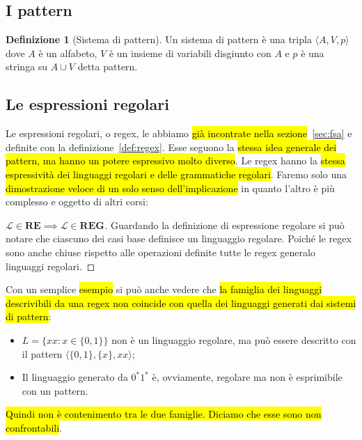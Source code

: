 \documentclass[a4paper,11pt,oneside]{article}
\theoremstyle{plain}
\theoremstyle{definition}
\newtheorem{defn}{Definizione}[section]
\theoremstyle{remark}
\begin{document}
\subsection{I pattern}\label{sec:pattern}

\begin{defn}[Sistema di pattern]
  Un sistema di pattern è una tripla $\langle A, V, p \rangle$ dove $A$ è un
  alfabeto, $V$ è un insieme di variabili disgiunto con $A$ e $p$ è una stringa
  su $A \cup V$ detta pattern.
\end{defn}

\subsection{Le espressioni regolari}\label{sec:regex}

Le espressioni regolari, o regex, le abbiamo \hl{già incontrate nella
sezione}~\ref{sec:fsa} e definite con la definizione~\ref{def:regex}. Esse
seguono la \hl{stessa idea generale dei pattern, ma hanno un potere espressivo
molto diverso}. Le regex hanno la\hl{ stessa espressività dei linguaggi regolari
e delle grammatiche regolari}. Faremo solo una \hl{dimostrazione veloce di un
solo senso dell'implicazione} in quanto l'altro è più complesso e oggetto di
altri corsi:

\begin{proof}[$\mathcal{L}\in\mathbf{RE} \implies \mathcal{L}\in\mathbf{REG}$]%
  \label{proof:equiv-re-reg-1}
  Guardando la definizione di espressione regolare si può notare che ciascuno
  dei casi base definisce un linguaggio regolare. Poiché le regex sono anche
  chiuse rispetto alle operazioni definite tutte le regex generalo linguaggi
  regolari.
\end{proof}

Con un semplice \hl{esempio} si può anche vedere che \hl{la famiglia dei
linguaggi descrivibili da una regex non coincide con quella dei linguaggi
generati dai sistemi di pattern}:

\begin{itemize}
  \item $L = \{xx : x \in \{0,1\}\}$ non è un linguaggio regolare, ma può essere
    descritto con il pattern $\langle \{0,1\}, \{x\}, xx\rangle$;
  \item Il linguaggio generato da $0^* 1^*$ è, ovviamente, regolare ma non è
    esprimibile con un pattern.
\end{itemize}

\hl{Quindi non è contenimento tra le due famiglie. Diciamo che esse sono non
confrontabili}.
\end{document}
